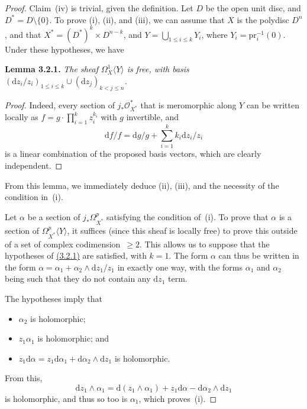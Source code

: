 \documentclass{report}
\newenvironment{itenv}[1]
  {\phantomsection\par\medskip\noindent\textbf{#1.}\itshape}
  {\medskip}
\renewcommand{\cal}[1]{{\mathcal{#1}}}
\newcommand{\dd}{\mathrm{d}}
\newcommand{\pr}{\mathrm{pr}}
\renewcommand{\geq}{\geqslant}
\renewcommand{\leq}{\leqslant}
\newcommand{\oldpage}[1]{\marginpar{\footnotesize$\Big\vert$ \textit{p.~#1}}}
\begin{document}
\oldpage{73}
\begin{proof}
  Claim~(iv) is trivial, given the definition.
  Let $D$ be the open unit disc, and $D^*=D\setminus\{0\}$.
  To prove (i), (ii), and (iii), we can assume that $X$ is the polydisc $D^n$, and that $X^*=(D^*)^k\times D^{n-k}$, and $Y=\bigcup_{1\leq i\leq k}Y_i$, where $Y_i=\pr_i^{-1}(0)$.
  Under these hypotheses, we have

  \begin{itenv}{Lemma 3.2.1}
  \label{II.3.2.1}
    The sheaf $\Omega_X^1\langle Y\rangle$ is free, with basis $(\dd z_i/z_i)_{1\leq i\leq k}\cup(\dd z_j)_{k<j\leq n}$.
  \end{itenv}

  \begin{proof}
    Indeed, every section of $j_*\cal{O}_{X^*}^*$ that is meromorphic along $Y$ can be written locally as $f=g\cdot\prod_{i=1}^k z_i^{k_i}$ with $g$ invertible, and
    \[
      \dd f/f = \dd g/g + \sum_{i=1}^k k_i\dd z_i/z_i
    \]
    is a linear combination of the proposed basis vectors, which are clearly independent.
  \end{proof}

  From this lemma, we immediately deduce (ii), (iii), and the necessity of the condition in~(i).

  Let $\alpha$ be a section of $j_*\Omega_{X^*}^p$ satisfying the condition of~(i).
  To prove that $\alpha$ is a section of $\Omega_{X^*}^p\langle Y\rangle$, it suffices (since this sheaf is locally free) to prove this outside of a set of complex codimension~$\geq2$.
  This allows us to suppose that the hypotheses of \hyperref[II.3.2.1]{(3.2.1)} are satisfied, with $k=1$.
  The form $\alpha$ can thus be written in the form $\alpha=\alpha_1+\alpha_2\wedge\dd z_1/z_1$ in exactly one way, with the forms $\alpha_1$ and $\alpha_2$ being such that they do not contain any $\dd z_1$ term.

  The hypotheses imply that
  \begin{itemize}
    \item $\alpha_2$ is holomorphic;
    \item $z_1\alpha_1$ is holomorphic; and
    \item $z_1\dd\alpha = z_1\dd\alpha_1+\dd\alpha_2\wedge\dd z_1$ is holomorphic.
  \end{itemize}

  From this,
  \[
    \dd z_1\wedge\alpha_1 = \dd(z_1\wedge\alpha_1) + z_1\dd\alpha - \dd\alpha_2\wedge\dd z_1
  \]
  is holomorphic, and thus so too is $\alpha_1$, which proves~(i).
\end{proof}
\end{document}
